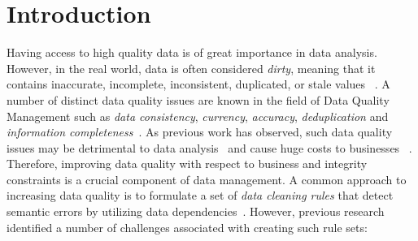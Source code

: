 \section{Introduction}
\label{sec:intro}


Having access to high quality data is of great importance in data analysis. However, in the real world, data is often considered \textit{dirty}, meaning that it contains inaccurate, incomplete, inconsistent, duplicated, or stale values ~\cite{chu2004blissful}. A number of distinct data quality issues are known in the field of Data Quality Management such as \textit{data consistency}, \textit{currency}, \textit{accuracy}, \textit{deduplication} and \textit{information completeness}~\cite{fan2012foundations}. As previous work has observed, such data quality issues may be detrimental to data analysis~\cite{national2013Frontiers,Fan:2008:CFD:1366102.1366103} and cause huge costs to businesses ~\cite{waynew.eckerson2002}. Therefore, improving data quality with respect to business and integrity constraints is a crucial component of data management. 
A common approach to increasing data quality is to formulate a set of \textit{data cleaning rules} that detect semantic errors by utilizing data dependencies~\cite{fan2012foundations, Arasu:2009:LDC:1546683.1547340, Dallachiesa:2013:NCD:2463676.2465327, llunaticVDLB2013b}. However, previous research identified a number of challenges associated with creating such rule sets: 

